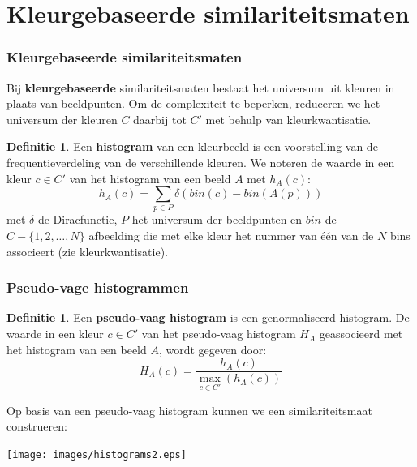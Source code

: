 \documentclass[dutch]{beamer}
\theoremstyle{definition}
\newtheorem{definitie}[theorem]{Definitie}
\theoremstyle{remark}
\theoremstyle{example}
\begin{document}
\section{Kleurgebaseerde similariteitsmaten}
\frame
{
  \frametitle{Kleurgebaseerde similariteitsmaten}

  Bij \textbf{kleurgebaseerde} similariteitsmaten bestaat het universum
  uit kleuren in plaats van beeldpunten. Om de complexiteit te beperken,
  reduceren we het universum der kleuren $C$ daarbij tot $C'$ met behulp van
  kleurkwantisatie.

  \begin{definitie}
  Een \textbf{histogram} van een kleurbeeld is een voorstelling van de frequentieverdeling
  van de verschillende kleuren. We noteren de waarde in een kleur $c \in C'$ van het histogram
  van een beeld $A$ met $h_A(c)$:
  \begin{displaymath}
  h_A(c) = \sum_{p \in P} \delta (bin(c) - bin(A(p))) 
  \end{displaymath} 
  met $\delta$ de Diracfunctie, $P$ het universum der beeldpunten en $bin$ de
  $C - \{1,2,\ldots,N\}$ afbeelding die met 
  elke kleur het nummer van \'e\'en van de $N$ bins associeert (zie kleurkwantisatie).
  \end{definitie}
}
\frame
{
  \frametitle{Pseudo-vage histogrammen}
  
  \begin{definitie}
  Een \textbf{pseudo-vaag histogram} is een genormaliseerd histogram.
  De waarde in een kleur $c \in C'$ van het pseudo-vaag histogram $H_A$
  geassocieerd met het histogram van een beeld $A$, wordt gegeven door:
  \begin{displaymath}
  H_A(c) = \frac{\displaystyle h_A(c)}{\displaystyle \max_{c \in C'}(h_A(c))}
  \end{displaymath}
  \end{definitie}

  Op basis van een pseudo-vaag histogram kunnen we een similariteitsmaat construeren:
  \begin{center}
  \texttt{[image: images/histograms2.eps]}
  \end{center}
}
\frame
\end{document}
